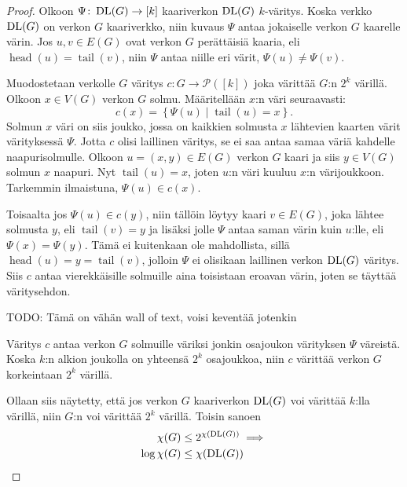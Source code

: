 \documentclass[finnish]{tktltiki2}
\theoremstyle{definition}
\theoremstyle{remark}
\newcommand{\set}[1]{\left\{ #1 \right\}}
\newcommand{\powerset}{\mathcal{P}}
\newcommand{\from}{\colon}
\DeclareMathOperator{\head}{head}
\DeclareMathOperator{\tail}{tail}
\begin{document}
\begin{proof}
    Olkoon $\Psi \from \DLG \to [k]$ kaariverkon $\operatorname{DL}(G)$ $k$-väritys. Koska
    verkko $\operatorname{DL}(G)$ on verkon $G$ kaariverkko, niin kuvaus $\Psi$ antaa
    jokaiselle verkon $G$ kaarelle värin. Jos $u, v \in E(G)$ ovat verkon $G$
    perättäisiä kaaria, eli $\head(u) = \tail(v)$, niin $\Psi$ antaa niille eri
    värit, $\Psi(u) \neq \Psi(v)$.

    Muodostetaan verkolle $G$ väritys $c \from G \to \powerset([k])$ joka
    värittää $G$:n $2^k$ värillä. Olkoon $x \in V(G)$ verkon $G$ solmu.
    Määritellään $x$:n väri seuraavasti:
    \begin{equation*}
        c(x) = \set{\Psi(u) \mid \tail(u) = x}.
    \end{equation*}
    Solmun $x$ väri on siis joukko, jossa on kaikkien solmusta $x$ lähtevien
    kaarten värit värityksessä $\Psi$. Jotta $c$ olisi laillinen väritys, se ei
    saa antaa samaa väriä kahdelle naapurisolmulle. Olkoon $u = (x,y) \in E(G)$
    verkon $G$ kaari ja siis $y \in V(G)$ solmun $x$ naapuri. Nyt $\tail(u) =
    x$, joten $u$:n väri kuuluu $x$:n värijoukkoon. Tarkemmin ilmaistuna,
    $\Psi(u) \in c(x)$.

    Toisaalta jos $\Psi(u) \in c(y)$, niin tällöin löytyy kaari $v \in E(G)$,
    joka lähtee solmusta $y$, eli $\tail(v) = y$ ja lisäksi jolle $\Psi$ antaa
    saman värin kuin $u$:lle, eli $\Psi(x) = \Psi(y)$. Tämä ei kuitenkaan ole
    mahdollista, sillä $\head(u) = y = \tail(v)$, jolloin $\Psi$ ei olisikaan
    laillinen verkon $\operatorname{DL}(G)$ väritys. Siis $c$ antaa vierekkäisille solmuille
    aina toisistaan eroavan värin, joten se täyttää väritysehdon.

    TODO: Tämä on vähän wall of text, voisi keventää jotenkin

    Väritys $c$ antaa verkon $G$ solmuille väriksi jonkin osajoukon värityksen
    $\Psi$ väreistä. Koska $k$:n alkion joukolla on yhteensä $2^k$ osajoukkoa,
    niin $c$ värittää verkon $G$ korkeintaan $2^k$ värillä.

    Ollaan siis näytetty, että jos verkon $G$ kaariverkon $\operatorname{DL}(G)$ voi värittää $k$:lla
    värillä, niin $G$:n voi värittää $2^k$ värillä. Toisin sanoen
    \begin{align*}
        \chi(G) &\leq 2^{\chi(\operatorname{DL}(G))} \implies \\
        \log \chi(G) &\leq \chi(\operatorname{DL}(G))
    \end{align*}
\end{proof}
\end{document}
